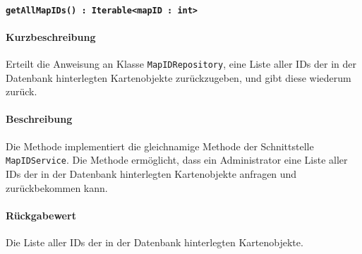 \paragraph{\texttt{getAllMapIDs() : Iterable<mapID : int>}}%
\paragraph*{Kurzbeschreibung}
Erteilt die Anweisung an Klasse \texttt{MapIDRepository}, eine Liste aller IDs der in der Datenbank hinterlegten Kartenobjekte zurückzugeben, und gibt diese wiederum zurück.
\paragraph*{Beschreibung}
Die Methode implementiert die gleichnamige Methode der Schnittstelle \texttt{MapIDService}.
Die Methode ermöglicht, dass ein Administrator eine Liste aller IDs der in der Datenbank hinterlegten Kartenobjekte anfragen und zurückbekommen kann.
\paragraph*{Rückgabewert}
Die Liste aller IDs der in der Datenbank hinterlegten Kartenobjekte.
